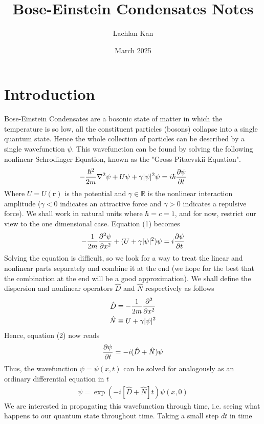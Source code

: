 \documentclass{article}
\title{Bose-Einstein Condensates Notes}
\author{Lachlan Kan}
\date{March 2025}
\newcommand{\ve}{\mathbf}
\begin{document}
\maketitle
\section{Introduction}
Bose-Einstein Condensates are a bosonic state of matter in which the temperature is so low, 
all the constituent particles (bosons) collapse into a single quantum state. Hence the whole 
collection of particles can be described by a single wavefunction $\psi$. This wavefunction can be 
found by solving the following nonlinear Schrodinger Equation, known as the "Gross-Pitaevskii Equation".
\begin{align}
    -\frac{\hbar^2}{2m}\nabla^2\psi+U\psi+\gamma|\psi|^2\psi=i\hbar\pdv{\psi}{t}
\end{align}
Where $U=U(\ve{r})$ is the potential and $\gamma\in\mathbb{R}$ is the 
nonlinear interaction amplitude ($\gamma<0$ indicates an attractive force and $\gamma>0$ indicates a repulsive force). 
We shall work in natural units where $\hbar=c=1$, and for now, restrict our view to the one dimensional case. 
Equation (1) becomes 
\begin{align}
    -\frac{1}{2m}\pdv[2]{\psi}{x}+(U+\gamma|\psi|^2)\psi=i\pdv{\psi}{t}
\end{align}
Solving the equation is difficult, so we look for a way to 
treat the linear and nonlinear parts separately and combine it at the end (we hope for the best that 
the combination at the end will be a good approximation).
We shall define the dispersion and nonlinear operators $\hat{D}$ and $\hat{N}$ respectively as follows
\begin{align}
    \hat{D} &\equiv -\frac{1}{2m}\pdv[2]{}{x}\\ 
    \hat{N} &\equiv U+\gamma|\psi|^2
\end{align}
Hence, equation (2) now reads 
\begin{align}
    \pdv{\psi}{t}=-i(\hat{D}+\hat{N})\psi
\end{align}
Thus, the wavefunction $\psi=\psi(x,t)$ can be solved for analogously as an ordinary differential 
equation in $t$ 
\begin{align}
    \psi=\exp(-i[\hat{D}+\hat{N}]t)\psi(x,0)
\end{align}
We are interested in propagating this wavefunction through time, i.e. 
seeing what happens to our quantum state throughout time. 
Taking a small step $dt$ in time 
\end{document}
